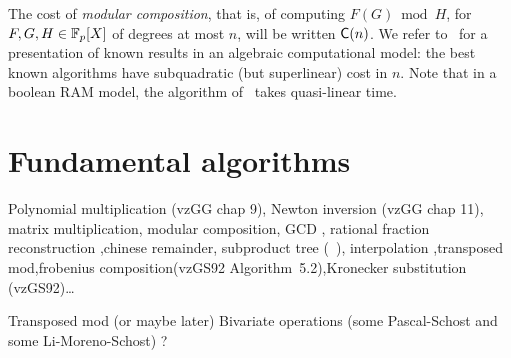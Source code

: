 The cost of {\em modular composition}, that is, of computing $F(G)
\bmod H$, for $F,G,H\in\mathbb{F}_p[X]$ of degrees at most $n$, will be
written $\mathsf{C}(n)$. We refer to~\cite[Ch.~12]{vzGG} for a
presentation of known results in an algebraic computational model: the
best known algorithms have subquadratic (but superlinear) cost in
$n$. Note that in a boolean RAM model, the algorithm of~\cite{KeUm08}
takes quasi-linear time.

\section{Fundamental algorithms}
\label{sec:fund-algor}
Polynomial multiplication (vzGG chap 9), Newton inversion (vzGG chap
11), matrix multiplication, modular composition, GCD
\cite[$\S$11.1]{vzGG}, rational fraction reconstruction
\cite[$\S$5.8]{vzGG} ,chinese remainder, subproduct tree
(~\cite[Algorithm~10.3]{vzGG}), interpolation
\cite[$\S$10.2]{vzGG},transposed mod,frobenius composition(vzGS92
Algorithm~5.2),Kronecker substitution (vzGS92)\ldots

Transposed mod (or maybe later)
Bivariate operations (some Pascal-Schost and some Li-Moreno-Schost) ?


